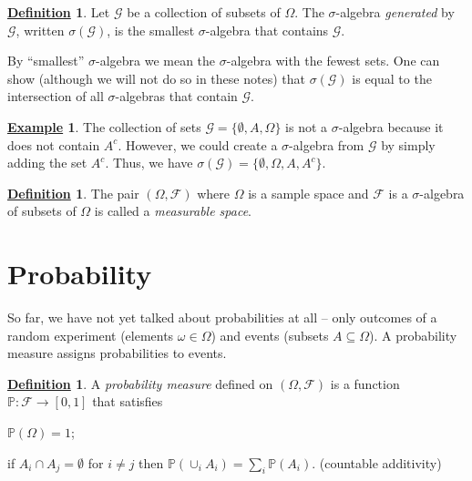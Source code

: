 \documentclass[12pt]{book}
\numberwithin{equation}{chapter}
\theoremstyle{plain}
\numberwithin{theorem}{section}
\theoremstyle{definition}
\newtheorem{definition}[theorem]{\underline{Definition}}
\newtheorem{example}[theorem]{\underline{Example}}
\numberwithin{exercise}{chapter}
\newcommand{\<}{\langle}
\renewcommand{\>}{\rangle}
\renewcommand{\(}{\left(}
\renewcommand{\)}{\right)}
\renewcommand{\[}{\left[}
\renewcommand{\]}{\right]}
\newcommand\Pb{\mathds{P}}
\newcommand\Fc{\mathscr{F}}
\newcommand\Gc{\mathscr{G}}
\newcommand\om{\omega}
\newcommand\Om{\Omega}
\newcommand\sig{\sigma}
\begin{document}
\begin{definition}
Let $\Gc$ be a collection of subsets of $\Om$.  The $\sigma$-algebra \emph{generated} by $\Gc$, written $\sig(\Gc)$, is the smallest $\sig$-algebra that contains $\Gc$.
\end{definition}

\noindent
By ``smallest'' $\sig$-algebra we mean the $\sig$-algebra with the fewest sets.
One can show (although we will not do so in these notes) that $\sig(\Gc)$ is equal to the intersection of all $\sig$-algebras that contain $\Gc$.

\begin{example}
The collection of sets $\Gc = \{ \emptyset, A , \Om \}$ is not a $\sig$-algebra because it does not contain $A^c$.  However, we could create a $\sig$-algebra from $\Gc$ by simply adding the set $A^c$.  Thus, we have $\sig(\Gc) = \{ \emptyset, \Om, A, A^c  \}$.  
\end{example}

\begin{definition}
The pair $(\Om,\Fc)$ where $\Om$ is a sample space and $\Fc$ is a $\sig$-algebra of subsets of $\Om$ is called a \emph{measurable space}.
\end{definition}




\section{Probability}
So far, we have not yet talked about probabilities at all -- only outcomes of a random experiment (elements $\om \in \Om$) and events (subsets $A \subseteq \Om$).  A probability measure assigns probabilities to events.
\begin{definition}
\label{def:P}
A \emph{probability measure} defined on $(\Om,\Fc)$ is a function $\Pb : \Fc \to [0,1]$ that satisfies
\begin{enumerate*}%
\item $\Pb( \Om ) = 1$; \label{itm:01}
\item if $A_i \cap A_j = \emptyset$ for $i \neq j$ then $\Pb( \cup_i A_i ) = \sum_i \Pb( A_i )$. (countable additivity) \label{itm:disjoint}
\end{enumerate*}
\end{definition}
\end{document}
